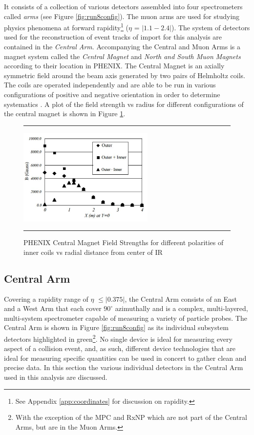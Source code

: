 It consists of a collection of various detectors assembled into four spectrometers called \textit{arms} (see Figure \ref{fig:run8config}). The muon arms are used for studying physics phenomena at forward rapidity\footnote{See Appendix \ref{app:coordinates} for discussion on rapidity.} ($\eta$ = $|1.1-2.4|$). \citep{rapidityref} The system of detectors used for the reconstruction of event tracks of import for this analysis are contained in the \textit{Central Arm}. Accompanying the Central and Muon Arms is a magnet system called the \textit{Central Magnet} and \textit{North and South Muon Magnets} according to their location in PHENIX. The Central Magnet is an axially symmetric field around the beam axis generated by two pairs of Helmholtz coils. The coils are operated independently and are able to be run in various configurations of positive and negative orientation in order to determine systematics \citep{rolnickthesis}. A plot of the field strength vs radius for different configurations of the central magnet is shown in Figure \ref{fig:centralmagnet}.

\begin{figure}[htbp]
  \centering
    \rule{35em}{0.5pt}
    \includegraphics[width=0.6\textwidth]{Figures/phenixcentralmagnet.JPG}
  \caption[PHENIX Central Magnet Field Strengths.]{PHENIX Central Magnet Field Strengths for different polarities of inner coils vs radial distance from center of IR}
  \label{fig:centralmagnet}
    \rule{35em}{0.5pt}
\end{figure}
\subsection{Central Arm}
Covering a rapidity range of $\eta$ $\leq|0.375|$, the Central Arm consists of an East and a West Arm that each cover $90^{\circ}$ azimuthally \citep{EMCfocus} and is a complex, multi-layered, multi-system spectrometer capable of measuring a variety of particle probes. The Central Arm is shown in Figure \ref{fig:run8config} as its individual subsystem detectors highlighted in green\footnote{With the exception of the MPC and RxNP which are not part of the Central Arms, but are in the Muon Arms.}. No single device is ideal for measuring every aspect of a collision event, and, as such, different device technologies that are ideal for measuring specific quantities can be used in concert to gather clean and precise data. In this section the various individual detectors in the Central Arm used in this analysis are discussed.

